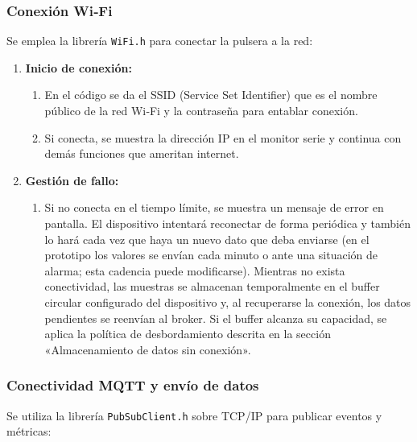 \documentclass[12pt, a4paper]{article}
\begin{document}
	\subsubsection{Conexión Wi‑Fi}
	Se emplea la librería \texttt{WiFi.h} para conectar la pulsera a la red:
	
	\begin{enumerate}
		\item \textbf{Inicio de conexión:}
		\begin{enumerate}
			\item En el código se da el SSID (Service Set Identifier) que es el nombre público de la red Wi‑Fi y la contraseña para entablar conexión.
			\item Si conecta, se muestra la dirección IP en el monitor serie y continua con demás funciones que ameritan internet.
		\end{enumerate}
		\item \textbf{Gestión de fallo:}
		\begin{enumerate}
			\item Si no conecta en el tiempo límite, se muestra un mensaje de error en pantalla. El dispositivo intentará reconectar de forma periódica y también lo hará cada vez que haya un nuevo dato que deba enviarse (en el prototipo los valores se envían cada minuto o ante una situación de alarma; esta cadencia puede modificarse). Mientras no exista conectividad, las muestras se almacenan temporalmente en el buffer circular configurado del dispositivo y, al recuperarse la conexión, los datos pendientes se reenvían al broker. Si el buffer alcanza su capacidad, se aplica la política de desbordamiento descrita en la sección «Almacenamiento de datos sin conexión».
	
		\end{enumerate}
	\end{enumerate}
	
	\subsubsection{Conectividad MQTT y envío de datos}
	
	Se utiliza la librería \texttt{PubSubClient.h} sobre TCP/IP para publicar eventos y métricas:
	
\end{document}
